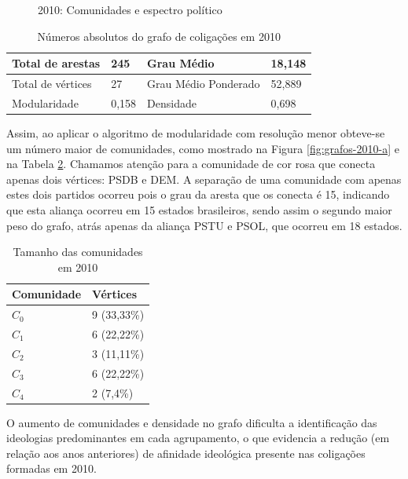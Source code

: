 \begin{figure}[h]
    \caption{2010: Comunidades e espectro político}
    \label{fig:grafos-2010}
\end{figure}

\begin{table}[h]
\centering
\begin{tabular}{|l|l|l|l|}
\hline
Total de arestas  & 245 & Grau Médio           & 18,148 \\ \hline
Total de vértices & 27 & Grau Médio Ponderado & 52,889 \\ \hline
Modularidade      & 0,158 & Densidade            & 0,698 \\ \hline
\end{tabular}
\caption{Números absolutos do grafo de coligações em 2010}
\label{table-2010a}
\end{table}

Assim, ao aplicar o algoritmo de modularidade com resolução menor obteve-se um número maior de comunidades, como mostrado na Figura \ref{fig:grafos-2010-a} e na Tabela \ref{table-2010b}. Chamamos atenção para a comunidade de cor rosa que conecta apenas dois vértices: \gls{PSDB} e \gls{DEM}. A separação de uma comunidade com apenas estes dois partidos ocorreu pois o grau da aresta que os conecta é 15, indicando que esta aliança ocorreu em 15 estados brasileiros, sendo assim o segundo maior peso do grafo, atrás apenas da aliança \gls{PSTU} e \gls{PSOL}, que ocorreu em 18 estados.

\begin{table}[h]
\centering
\begin{tabular}{|l|l|}
\hline
Comunidade & Vértices \\ \hline
$C_0$         &     9 (33,33\%)                \\ \hline
$C_1$         &     6 (22,22\%)                \\ \hline
$C_2$         &       3 (11,11\%)               \\ \hline
$C_3$         &       6 (22,22\%)               \\ \hline
$C_4$         &       2 (7,4\%)               \\ \hline
\end{tabular}
\caption{Tamanho das comunidades em 2010}
\label{table-2010b}
\end{table}

O aumento de comunidades e densidade no grafo dificulta a identificação das ideologias predominantes em cada agrupamento, o que evidencia a redução (em relação aos anos anteriores) de afinidade ideológica presente nas coligações formadas em 2010.

